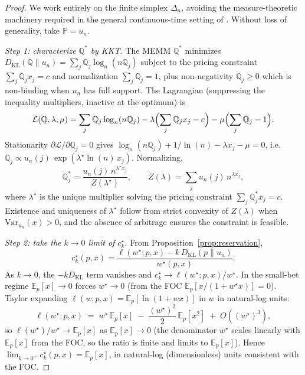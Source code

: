 \documentclass[11pt]{article}
\theoremstyle{definition}
\theoremstyle{remark}
\newcommand{\E}{\mathbb{E}}
\newcommand{\PP}{\mathbb{P}}
\newcommand{\Q}{\mathbb{Q}}
\newcommand{\KL}{D_{\mathrm{KL}}}
\begin{document}
\begin{proof}
We work entirely on the finite simplex $\Delta_n$, avoiding the
measure-theoretic machinery required in the general continuous-time
setting of \citet{frittelli2000}. Without loss of generality, take
$\PP = u_n$.

\emph{Step 1: characterize $\Q^*$ by KKT.} The MEMM $\Q^*$ minimizes
$\KL(\Q \| u_n) = \sum_j \Q_j \log_n(n \Q_j)$ subject to the pricing
constraint $\sum_j \Q_j x_j = c$ and normalization $\sum_j \Q_j = 1$,
plus non-negativity $\Q_j \ge 0$ which is non-binding when $u_n$ has
full support. The Lagrangian (suppressing the inequality multipliers,
inactive at the optimum) is
\begin{equation*}
\mathcal{L}(\Q, \lambda, \mu) = \sum_j \Q_j \log_n(n \Q_j)
   - \lambda \Bigl( \sum_j \Q_j x_j - c \Bigr)
   - \mu \Bigl( \sum_j \Q_j - 1 \Bigr).
\end{equation*}
Stationarity $\partial \mathcal{L} / \partial \Q_j = 0$ gives
$\log_n(n \Q_j) + 1/\ln(n) - \lambda x_j - \mu = 0$, i.e.\
$\Q_j \propto u_n(j) \, \exp(\lambda^\star \ln(n) \, x_j)$.
Normalizing,
\begin{equation}
\Q^*_j = \frac{u_n(j) \, n^{\lambda^\star x_j}}{Z(\lambda^\star)},
\qquad
Z(\lambda) = \sum_j u_n(j) \, n^{\lambda x_j},
\label{eq:memm-exp-tilt}
\end{equation}
where $\lambda^\star$ is the unique multiplier solving the pricing
constraint $\sum_j \Q^*_j x_j = c$. Existence and uniqueness of
$\lambda^\star$ follow from strict convexity of $Z(\lambda)$ when
$\mathrm{Var}_{u_n}(x) > 0$, and the absence of arbitrage ensures the
constraint is feasible.

\emph{Step 2: take the $k \to 0$ limit of $c^\star_k$.} From
Proposition~\ref{prop:reservation},
\begin{equation*}
c^\star_k(p, x) = \frac{\ell(w^\star; p, x) - k \, \KL(p \| u_n)}{w^\star(p, x)}.
\end{equation*}
As $k \to 0$, the $-k \KL$ term vanishes and $c^\star_k \to
\ell(w^\star; p, x)/w^\star$. In the small-bet regime $\E_p[x] \to 0$
forces $w^\star \to 0$ (from the FOC $\E_p[x/(1 + w^\star x)] = 0$).
Taylor expanding $\ell(w; p, x) = \E_p[\ln(1 + w x)]$ in $w$ in
natural-log units:
\begin{equation*}
\ell(w^\star; p, x) \;=\; w^\star \, \E_p[x] \;-\; \frac{(w^\star)^2}{2} \, \E_p[x^2] \;+\; O((w^\star)^3),
\end{equation*}
so $\ell(w^\star) / w^\star \to \E_p[x]$ as $\E_p[x] \to 0$ (the
denominator $w^\star$ scales linearly with $\E_p[x]$ from the FOC, so
the ratio is finite and limits to $\E_p[x]$). Hence
$\lim_{k \to 0^+} c^\star_k(p, x) = \E_p[x]$, in natural-log
(dimensionless) units consistent with the FOC.


\end{proof}
\end{document}
